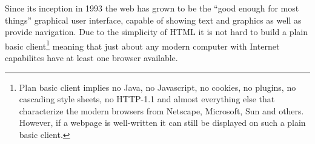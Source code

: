 Since its inception in 1993 the web has grown to be the ``good enough
for most things'' graphical user interface, capable of showing text
and graphics as well as provide navigation.  Due to the simplicity of
HTML it is not hard to build a plain basic client\footnote{Plan basic
  client implies no Java, no Javascript, no cookies, no plugins, no
  cascading style sheets, no HTTP-1.1 and almost everything else that
  characterize the modern browsers from Netscape, Microsoft, Sun and
  others.  However, if a webpage is well-written it can
  still be displayed on such a plain basic client. } meaning that just
about any modern computer with Internet capabilites have at least one
browser available.









